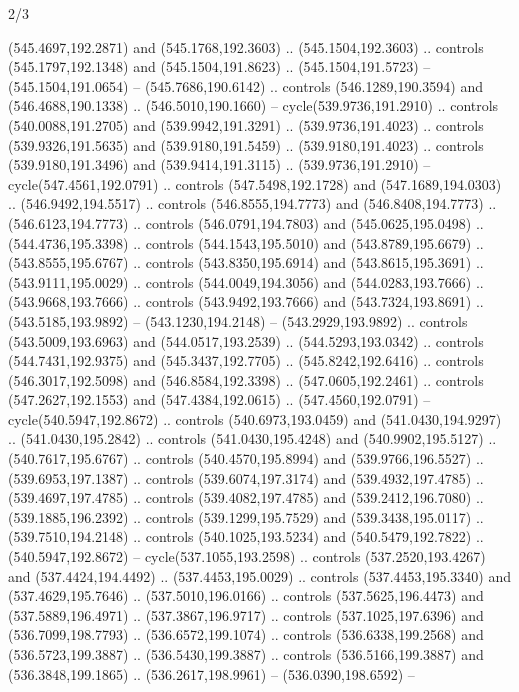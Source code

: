 \begin{flagdescription}{2/3}
\begin{scope}[xshift=0.5\flaglength,yshift=0.5\flagwidth,scale=\flagwidth/495.65]
\begin{scope}[y=0.8pt, x=0.8pt, yscale=-1,shift={(-463.76,-309.78)}]
  (545.4697,192.2871) and (545.1768,192.3603) .. (545.1504,192.3603) .. controls
  (545.1797,192.1348) and (545.1504,191.8623) .. (545.1504,191.5723) --
  (545.1504,191.0654) -- (545.7686,190.6142) .. controls (546.1289,190.3594) and
  (546.4688,190.1338) .. (546.5010,190.1660) -- cycle(539.9736,191.2910) ..
  controls (540.0088,191.2705) and (539.9942,191.3291) .. (539.9736,191.4023) ..
  controls (539.9326,191.5635) and (539.9180,191.5459) .. (539.9180,191.4023) ..
  controls (539.9180,191.3496) and (539.9414,191.3115) .. (539.9736,191.2910) --
  cycle(547.4561,192.0791) .. controls (547.5498,192.1728) and
  (547.1689,194.0303) .. (546.9492,194.5517) .. controls (546.8555,194.7773) and
  (546.8408,194.7773) .. (546.6123,194.7773) .. controls (546.0791,194.7803) and
  (545.0625,195.0498) .. (544.4736,195.3398) .. controls (544.1543,195.5010) and
  (543.8789,195.6679) .. (543.8555,195.6767) .. controls (543.8350,195.6914) and
  (543.8615,195.3691) .. (543.9111,195.0029) .. controls (544.0049,194.3056) and
  (544.0283,193.7666) .. (543.9668,193.7666) .. controls (543.9492,193.7666) and
  (543.7324,193.8691) .. (543.5185,193.9892) -- (543.1230,194.2148) --
  (543.2929,193.9892) .. controls (543.5009,193.6963) and (544.0517,193.2539) ..
  (544.5293,193.0342) .. controls (544.7431,192.9375) and (545.3437,192.7705) ..
  (545.8242,192.6416) .. controls (546.3017,192.5098) and (546.8584,192.3398) ..
  (547.0605,192.2461) .. controls (547.2627,192.1553) and (547.4384,192.0615) ..
  (547.4560,192.0791) -- cycle(540.5947,192.8672) .. controls
  (540.6973,193.0459) and (541.0430,194.9297) .. (541.0430,195.2842) .. controls
  (541.0430,195.4248) and (540.9902,195.5127) .. (540.7617,195.6767) .. controls
  (540.4570,195.8994) and (539.9766,196.5527) .. (539.6953,197.1387) .. controls
  (539.6074,197.3174) and (539.4932,197.4785) .. (539.4697,197.4785) .. controls
  (539.4082,197.4785) and (539.2412,196.7080) .. (539.1885,196.2392) .. controls
  (539.1299,195.7529) and (539.3438,195.0117) .. (539.7510,194.2148) .. controls
  (540.1025,193.5234) and (540.5479,192.7822) .. (540.5947,192.8672) --
  cycle(537.1055,193.2598) .. controls (537.2520,193.4267) and
  (537.4424,194.4492) .. (537.4453,195.0029) .. controls (537.4453,195.3340) and
  (537.4629,195.7646) .. (537.5010,196.0166) .. controls (537.5625,196.4473) and
  (537.5889,196.4971) .. (537.3867,196.9717) .. controls (537.1025,197.6396) and
  (536.7099,198.7793) .. (536.6572,199.1074) .. controls (536.6338,199.2568) and
  (536.5723,199.3887) .. (536.5430,199.3887) .. controls (536.5166,199.3887) and
  (536.3848,199.1865) .. (536.2617,198.9961) -- (536.0390,198.6592) --

\end{scope}
\end{scope}
\end{flagdescription}

